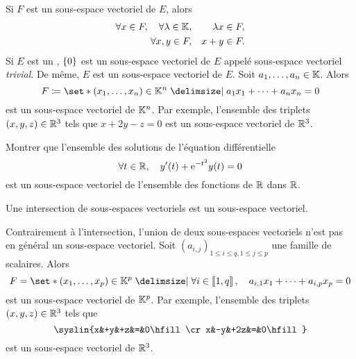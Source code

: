 \documentclass{magnoliaold}
\begin{document}
\begin{remarques}
\remarque Si $F$ est un sous-espace vectoriel de $E$, alors
  \begin{eqnarray*}
\forall x\in F,\quad \forall \lambda\in\mathbb{K},& & \lambda x\in F,\\
\forall x,y\in F,& & x+y \in F.
	\end{eqnarray*}
\remarque[utile=-3] Si $E$ est un \Kev, $\left\{0\right\}$ est un sous-espace vectoriel de $E$
  appelé sous-espace vectoriel \emph{trivial}. De même, $E$ est un sous-espace vectoriel de
	$E$.
\remarque[utile=-2] Soit $a_1,\ldots,a_n\in\mathbb{K}$. Alors
  \[F\defeq\enstq{(x_1,\ldots,x_n)\in\K^n}{a_1 x_1+\cdots+a_n x_n=0}\]
  est un sous-espace vectoriel de $\mathbb{K}^n$. Par exemple, l'ensemble des triplets $(x,y,z)\in\mathbb{R}^3$ tels que
  $x+2y-z=0$ est un sous-espace vectoriel de $\mathbb{R}^3$.
\end{remarques}

\begin{exoUnique}
\exo Montrer que l'ensemble des solutions de l'équation différentielle
  \[\forall t\in\mathbb{R},\quad y'(t)+{\rm e}^{-t^2}y(t)=0\]
  est un sous-espace vectoriel de l'ensemble des fonctions de $\mathbb{R}$ dans $\mathbb{R}$.
\end{exoUnique}



\begin{proposition}[utile=-3]
Une intersection de sous-espaces vectoriels est un sous-espace vectoriel.
\end{proposition}

\begin{remarques}
\remarque[utile=-1] Contrairement à l'intersection, l'union de deux sous-espaces
  vectoriels n'est pas en général un sous-espace vectoriel.
\remarque[utile=-2] Soit $(a_{i,j})_{1\leq i\leq q, 1\leq j\leq p}$ une famille de
  scalaires. Alors
  \[F=\enstq{(x_1,\ldots,x_p)\in\K^p}%
    {\forall i\in\intere{1}{q} \qsep
     a_{i,1} x_1+\cdots+a_{i,p} x_p=0}\]
  est un sous-espace vectoriel de $\mathbb{K}^p$. Par exemple, l'ensemble des triplets $(x,y,z)\in\mathbb{R}^3$ tels que
  \[\syslin{x&+y&+z&=&0\hfill\cr
            x&-y&+2z&=&0\hfill}\]
  est un sous-espace vectoriel de $\mathbb{R}^3$.
\end{remarques}
\end{document}
